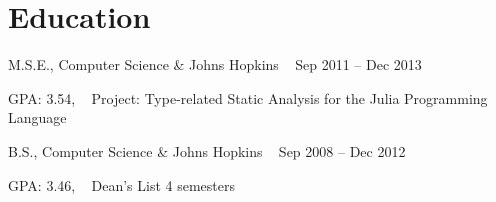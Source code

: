 \documentclass[letterpaper]{article}
\begin{document}

\section*{Education}
\begin{list1}
 \item
  \begin{tabular1bold}
   M.S.E., Computer Science & Johns Hopkins \mbox{ } Sep 2011 -- Dec 2013 \\
  \end{tabular1bold}

 \begin{list2}
  \item GPA: 3.54, \mbox{ } 
   Project: Type-related Static Analysis for the Julia Programming Language
 \end{list2}

 \item
  \begin{tabular1bold}
   B.S., Computer Science & Johns Hopkins \mbox{ } Sep 2008 -- Dec 2012 \\
  \end{tabular1bold}

  \begin{list2}
  \item 
	    GPA: 3.46, \mbox{ }
	    Dean's List 4 semesters
  \end{list2}

\end{list1}
\end{document}
